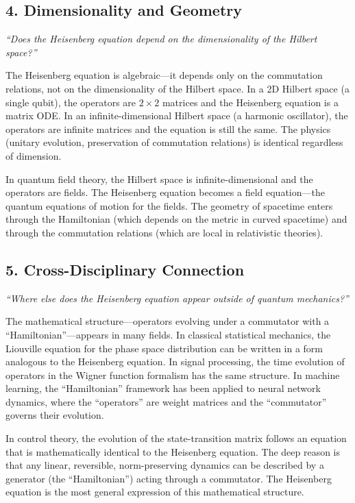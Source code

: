 \documentclass[11pt,openright]{book}
\begin{document}
\subsection*{4. Dimensionality and Geometry}
\textit{``Does the Heisenberg equation depend on the dimensionality of the Hilbert space?''}

The Heisenberg equation is algebraic---it depends only on the commutation relations, not on the dimensionality of the Hilbert space. In a 2D Hilbert space (a single qubit), the operators are $2\times 2$ matrices and the Heisenberg equation is a matrix ODE. In an infinite-dimensional Hilbert space (a harmonic oscillator), the operators are infinite matrices and the equation is still the same. The physics (unitary evolution, preservation of commutation relations) is identical regardless of dimension.

In quantum field theory, the Hilbert space is infinite-dimensional and the operators are fields. The Heisenberg equation becomes a field equation---the quantum equations of motion for the fields. The geometry of spacetime enters through the Hamiltonian (which depends on the metric in curved spacetime) and through the commutation relations (which are local in relativistic theories).

\subsection*{5. Cross-Disciplinary Connection}
\textit{``Where else does the Heisenberg equation appear outside of quantum mechanics?''}

The mathematical structure---operators evolving under a commutator with a ``Hamiltonian''---appears in many fields. In classical statistical mechanics, the Liouville equation for the phase space distribution can be written in a form analogous to the Heisenberg equation. In signal processing, the time evolution of operators in the Wigner function formalism has the same structure. In machine learning, the ``Hamiltonian'' framework has been applied to neural network dynamics, where the ``operators'' are weight matrices and the ``commutator'' governs their evolution.

In control theory, the evolution of the state-transition matrix follows an equation that is mathematically identical to the Heisenberg equation. The deep reason is that any linear, reversible, norm-preserving dynamics can be described by a generator (the ``Hamiltonian'') acting through a commutator. The Heisenberg equation is the most general expression of this mathematical structure.
\end{document}
